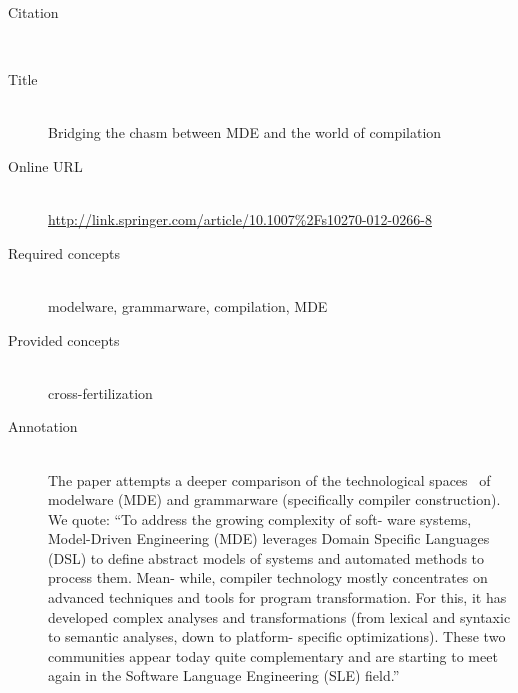 \begin{description}
\item[Citation]\mbox{}\\
\cite{JezequelCDGR12}
\item[Title]\mbox{}\\
Bridging the chasm between MDE and the world of compilation
\item[Online URL]\mbox{}\\
{\footnotesize\url{http://link.springer.com/article/10.1007%2Fs10270-012-0266-8}}
\item[Required concepts]\mbox{}\\
modelware, grammarware, compilation, MDE\item[Provided concepts]\mbox{}\\
cross-fertilization\item[Annotation]\mbox{}\\
The paper attempts a deeper comparison of the technological spaces~\cite{KurtevBA02} of modelware (MDE) and grammarware (specifically compiler construction). We quote: ``To address the growing complexity of soft- ware systems, Model-Driven Engineering (MDE) leverages Domain Specific Languages (DSL) to define abstract models of systems and automated methods to process them. Mean- while, compiler technology mostly concentrates on advanced techniques and tools for program transformation. For this, it has developed complex analyses and transformations (from lexical and syntaxic to semantic analyses, down to platform- specific optimizations). These two communities appear today quite complementary and are starting to meet again in the Software Language Engineering (SLE) field.''
\end{description}

